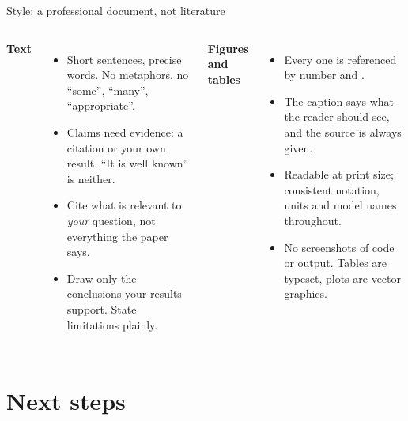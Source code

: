 \documentclass[aspectratio=169,11pt,t]{beamer}
\begin{document}
\begin{frame}{Style: a professional document, not literature}
  \begin{columns}[T,onlytextwidth]
    \textbf{Text}
    \begin{itemize}
      \item Short sentences, precise words. No metaphors, no ``some'', ``many'', ``appropriate''.
      \item Claims need evidence: a citation or your own result. ``It is well known'' is neither.
      \item Cite what is relevant to \emph{your} question, not everything the paper says.
      \item Draw only the conclusions your results support. State limitations plainly.
    \end{itemize}
    \textbf{Figures and tables}
    \begin{itemize}
      \item Every one is referenced by number and .
      \item The caption says what the reader should see, and the source is always given.
      \item Readable at print size; consistent notation, units and model names throughout.
      \item No screenshots of code or output. Tables are typeset, plots are vector graphics.
    \end{itemize}
  \end{columns}
\end{frame}

\section{Next steps}
\end{document}
